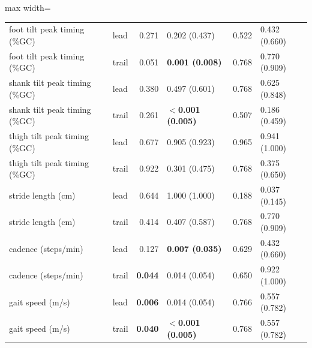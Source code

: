 \begin{adjustbox}{max width=\textwidth}
{\begin{tabular}{llrlrl}
foot tilt peak timing (\%GC) & lead & 0.271 & 0.202 (0.437) & 0.522 & 0.432 (0.660) \\
foot tilt peak timing (\%GC) & trail & 0.051 & \textbf{0.001 (0.008)} & 0.768 & 0.770 (0.909) \\
shank tilt peak timing (\%GC) & lead & 0.380 & 0.497 (0.601) & 0.768 & 0.625 (0.848) \\
shank tilt peak timing (\%GC) & trail & 0.261 & \textbf{$<$0.001 (0.005)} & 0.507 & 0.186 (0.459) \\
thigh tilt peak timing (\%GC) & lead & 0.677 & 0.905 (0.923) & 0.965 & 0.941 (1.000) \\
thigh tilt peak timing (\%GC) & trail & 0.922 & 0.301 (0.475) & 0.768 & 0.375 (0.650) \\
stride length (cm) & lead & 0.644 & 1.000 (1.000) & 0.188 & 0.037 (0.145) \\
stride length (cm) & trail & 0.414 & 0.407 (0.587) & 0.768 & 0.770 (0.909) \\
cadence (steps/min) & lead & 0.127 & \textbf{0.007 (0.035)} & 0.629 & 0.432 (0.660) \\
cadence (steps/min) & trail & \textbf{0.044} & 0.014 (0.054) & 0.650 & 0.922 (1.000) \\
gait speed (m/s) & lead & \textbf{0.006} & 0.014 (0.054) & 0.766 & 0.557 (0.782) \\
gait speed (m/s) & trail & \textbf{0.040} & \textbf{$<$0.001 (0.005)} & 0.768 & 0.557 (0.782) \\
\bottomrule
\end{tabular}
}
\end{adjustbox}
